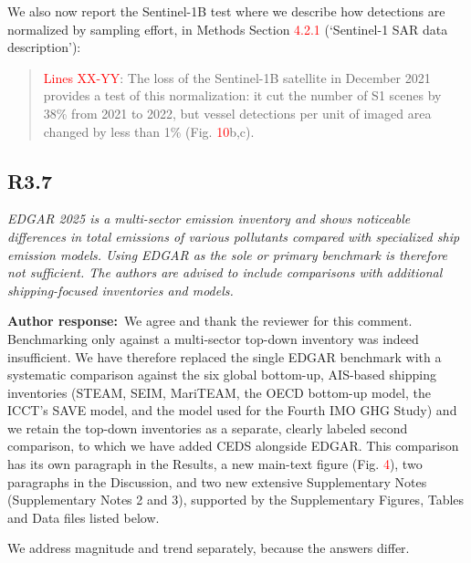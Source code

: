 \documentclass[11pt]{article}
\newcommand{\point}[1]{\subsection*{\normalfont\bfseries #1}}
\newcommand{\response}{\par\medskip\noindent%
  \textbf{\textcolor{respblue}{Author response:}}\ }
\begin{document}
We also now report the Sentinel-1B test where we describe how detections are normalized by sampling effort, in Methods Section \textcolor{red}{4.2.1} (`Sentinel-1 SAR data description'):

\begin{quote}
\textcolor{red}{Lines XX-YY}: The loss of the Sentinel-1B satellite in December 2021 provides a test of this normalization: it cut the number of S1 scenes by 38\% from 2021 to 2022, but vessel detections per unit of imaged area changed by less than 1\% (Fig. \textcolor{red}{10}b,c).
\end{quote}

\point{R3.7}

\begin{refquote}\itshape
EDGAR 2025 is a multi-sector emission inventory and shows noticeable differences in total emissions of various pollutants compared with specialized ship emission models. Using EDGAR as the sole or primary benchmark is therefore not sufficient. The authors are advised to include comparisons with additional shipping-focused inventories and models.
\end{refquote}

\response We agree and thank the reviewer for this comment. Benchmarking only against a multi-sector top-down inventory was indeed insufficient. We have therefore replaced the single EDGAR benchmark with a systematic comparison against the six global bottom-up, AIS-based shipping inventories (STEAM, SEIM, MariTEAM, the OECD bottom-up model, the ICCT's SAVE model, and the model used for the Fourth IMO GHG Study) and we retain the top-down inventories as a separate, clearly labeled second comparison, to which we have added CEDS alongside EDGAR. This comparison has its own paragraph in the Results, a new main-text figure (Fig. \textcolor{red}{4}), two paragraphs in the Discussion, and two new extensive Supplementary Notes (Supplementary Notes 2 and 3), supported by the Supplementary Figures, Tables and Data files listed below.

We address magnitude and trend separately, because the answers differ.
\end{document}
